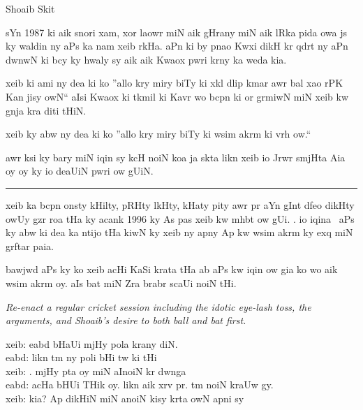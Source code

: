 \documentclass{article}
\begin{document}
\begin{center} \LARGE
	Shoaib Skit
\end{center}

\startUrdu

	sYn 1987 ki aik snori xam, xor laowr miN aik gHrany miN aik lRka pida owa js ky waldin ny aPs ka nam xeib rkHa.
	aPn ki by pnao Kwxi dikH kr qdrt ny aPn dwnwN ki bcy ky hwaly sy aik aik Kwaox pwri krny ka weda kia.


	xeib ki ami ny dea ki ko ''allo kry miry biTy ki xkl dlip kmar awr bal xao rPK Kan jisy owN`` aIsi Kwaox ki tkmil ki Kavr wo bcpn ki or grmiwN miN xeib kw gnja kra diti tHiN. \hfill {}

	xeib ky abw ny dea ki ko ''allo kry miry biTy ki  wsim akrm ki vrh ow.``

	awr ksi ky bary miN iqin sy kcH noiN koa ja skta likn xeib io Jrwr smjHta Aia oy oy ky io deaUiN pwri ow gUiN.

\rule{\textwidth}{1pt}

	xeib ka bcpn onsty kHilty, pRHty lkHty,  kHaty pity awr  pr aYn gInt dfeo  dikHty owUy gzr roa tHa ky acank 1996 ky As pas xeib kw mhbt ow gUi.
	.
	io iqina~ aPs ky abw ki dea ka ntijo tHa kiwN ky xeib ny apny Ap kw wsim akrm ky exq miN grftar paia.

	bawjwd aPs ky ko xeib acHi KaSi  krata tHa ab aPs kw iqin ow gia ko wo aik  wsim akrm oy.
	aIs bat miN Zra brabr scaUi noiN tHi.

\begin{enpara}
	\itshape
	Re-enact a regular cricket session including the idotic eye-lash toss, the arguments, and Shoaib's desire to both ball and bat first.
\end{enpara}

	\vspace{0.5\baselineskip}
	xeib:  eabd bHaUi mjHy pola  krany diN.\\
	eabd: likn tm ny poli  bHi tw ki tHi\\
	xeib: . mjHy pta oy miN aInoiN  kr dwnga\\
	eabd: acHa bHUi THik oy.
	likn aik xrv pr.
	tm  noiN kraUw gy.\\
	xeib: kia? Ap dikHiN miN anoiN kisy  krta owN apni  sy
\end{document}
